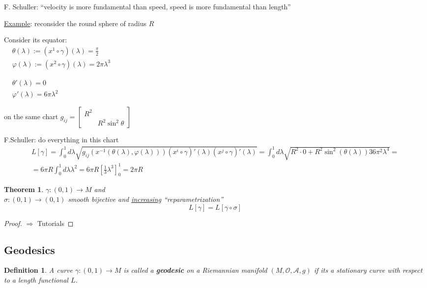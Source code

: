 \documentclass[10pt]{amsart}
\newtheorem{theorem}{Theorem}
\newtheorem{definition}{Definition}
\begin{document}
\begin{multicols*}{2}
	F. Schuller: ``velocity is more fundamental than speed, speed is more fundamental than length''
	
	\underline{Example}: reconsider the round sphere of radius $R$
	
	Consider its equator: \\
	$\begin{aligned}
	&  \theta(\lambda) := (x^1 \circ \gamma)(\lambda) = \frac{\pi}{2} \\ 
	& \varphi(\lambda) := (x^2 \circ \gamma)(\lambda) = 2\pi \lambda^3   
	\end{aligned}$
	
	$\begin{aligned}
	& \theta'(\lambda) = 0 \\
	& \varphi'(\lambda) = 6\pi\lambda^2 
	\end{aligned}$
	
	on the same chart $g_{ij} = \left[ \begin{matrix} R^2 & \\ 
	& R^2 \sin^2{\theta} \end{matrix} \right]$
	
	F.Schuller: do everything in this chart
	\[
	\begin{gathered}
	L[\gamma] = \int_0^1 d\lambda \sqrt{ g_{ij}(x^{-1}(\theta(\lambda) , \varphi(\lambda)))(x^i\circ \gamma)'(\lambda)(x^j\circ \gamma)'(\lambda) } = \int_0^1 d\lambda \sqrt{ R^2 \cdot 0 + R^2\sin^2{(\theta(\lambda))} 36 \pi^2 \lambda^4 } = \\
	= 6\pi R \int_0^1 d\lambda \lambda^2 = 6\pi R [ \frac{1}{3} \lambda^3 ]^1_0 = 2\pi R
	\end{gathered}
	\]
	
	\begin{theorem}
		$\gamma: (0,1) \to M$ and \\
		$\sigma:(0,1) \to (0,1)$ smooth bijective and \underline{increasing} ``reparametrization''
		\[
		L[\gamma] = L[\gamma \circ \sigma]
		\]
	\end{theorem}
	\begin{proof}
		$\Longrightarrow $ Tutorials
	\end{proof}
	
	\subsection{Geodesics}
	
	\begin{definition}
		A curve $\gamma:(0,1) \to M$ is called a \textbf{geodesic} on a Riemannian manifold $(M,\mathcal{O}, \mathcal{A}, g)$ if its a \emph{stationary} curve with respect to a length functional $L$.  
	\end{definition}
	

\end{multicols*}
\end{document}
